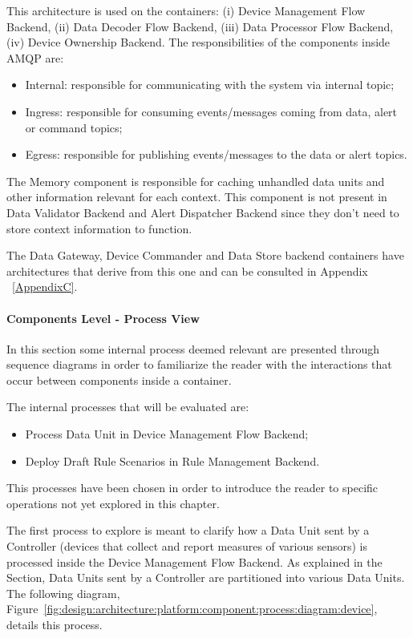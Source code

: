 This architecture is used on the containers: (i) Device Management Flow Backend, (ii) Data Decoder Flow Backend, (iii) Data Processor Flow Backend, (iv) Device Ownership Backend. The responsibilities of the components inside AMQP are:

\begin{itemize}
   \item Internal: responsible for communicating with the system via internal topic;
   \item Ingress: responsible for consuming events/messages coming from data, alert or command topics;
   \item Egress: responsible for publishing events/messages to the data or alert topics.
\end{itemize}

The Memory component is responsible for caching unhandled data units and other information relevant for each context. This component is not present in Data Validator Backend and Alert Dispatcher Backend since they don't need to store context information to function.

The Data Gateway, Device Commander and Data Store backend containers have architectures that derive from this one and can be consulted in Appendix ~\ref{AppendixC}.

\paragraph{Components Level - Process View}
\label{par:design:architecture:platform:components:process}

In this section some internal process deemed relevant are presented through sequence diagrams in order to familiarize the reader with the interactions that occur between components inside a container.

The internal processes that will be evaluated are:

\begin{itemize}
   \item Process Data Unit in Device Management Flow Backend;
   \item Deploy Draft Rule Scenarios in Rule Management Backend.
\end{itemize}

This processes have been chosen in order to introduce the reader to specific operations not yet explored in this chapter.

The first process to explore is meant to clarify how a Data Unit sent by a Controller (devices that collect and report measures of various sensors) is processed inside the Device Management Flow Backend. As explained in the  Section, Data Units sent by a Controller are partitioned into various Data Units. The following diagram, Figure~\ref{fig:design:architecture:platform:component:process:diagram:device}, details this process.

